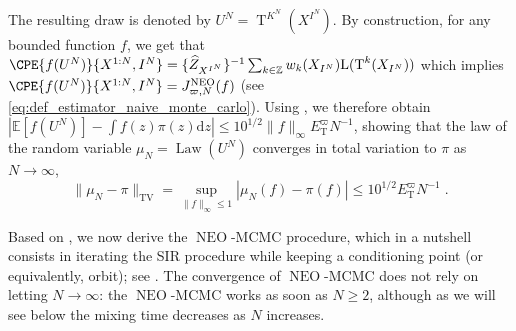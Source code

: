 \documentclass{article}
\def\IFIS{\ensuremath{\operatorname{NEO}}}
\def\InFiNE{{\small \IFIS}}
\def\NEO{{\small \IFIS}}
\def\transfo{\operatorname{T}}
\def\rmd{\operatorname{d}\hspace{-2pt}}
\def\PE{\mathbb{E}}
\def\rmd{\mathrm{d}}
\def\eqsp{\,}
\newcommand{\tvnorm}[1]{\| #1 \|_{\mathrm{TV}}}
\def\eqsp{\;}
\newcommand{\1}{\mathds{1}}
\def\target{\pi}
\newcommand{\chunku}[3]{#1^{#2:#3}}
\newcommand{\estConstC}[1]{\widehat{Z}_{#1}}
\def\zset{\mathbb{Z}}
\def\rmd{\mathrm{d}}
\def\likelihood{\mathrm{L}}
\def\infineSNIS{J^{\NEO}_{\varpi,N}}
\begin{document}
The resulting draw is denoted by $U^N= \transfo^{K^N}(X^{I^N})$. 
By construction, for any bounded function $f$, we get that $\CPE{f(U^N)}{\chunku{X}{1}{N},I^N}= \{ \estConstC{X^{I^N}} \}^{-1} \sum_{k \in \zset} w_k(X_{I^N})\likelihood(\transfo^k(X_{I^N}))$  which implies $\CPE{f(U^N)}{\chunku{X}{1}{N},I^N} =\infineSNIS(f)$ (see \eqref{eq:def_estimator_naive_monte_carlo}). Using , we therefore obtain $|\PE[f(U^N)]- \int f(z) \target(z) \rmd z| \leq 10^{1/2}\|f\|_\infty E^{\varpi} _{\transfo} N^{-1}$, showing that the law of the random variable $\mu_N= \operatorname{Law}(U^N)$ converges in total variation to $\target$ as $N \to \infty$, 
\begin{equation}
\label{eq:convergence-tvnorm}
\tvnorm{\mu_N - \pi} = \sup_{\|f\|_\infty \leq 1} |\mu_N(f) - \pi(f)| \leq  10^{1/2} E^{\varpi} _{\transfo} N^{-1} \eqsp.
\end{equation}

Based on  \cite{andrieu2010particle}, we now derive the \InFiNE-MCMC procedure, which in a nutshell consists in iterating the SIR procedure while keeping a conditioning point (or equivalently, orbit); see . The convergence of \IFIS-MCMC does not rely on letting $N \to \infty$: the \IFIS-MCMC works as soon as $N \geq 2$, although as we will see below the mixing time decreases as $N$ increases. 
\end{document}
